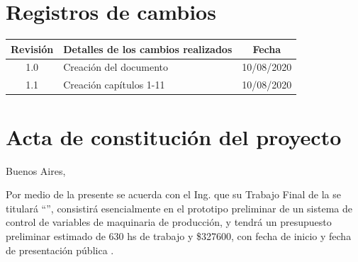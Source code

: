 \documentclass[11pt]{charter}
\begin{document}
\maketitle
\thispagestyle{empty}
\pagebreak


\thispagestyle{empty}
{\setlength{\parskip}{0pt}
\tableofcontents{}
}
\pagebreak


\section{Registros de cambios}
\label{sec:registro}


\begin{table}[ht]
\label{tab:registro}
\centering
\begin{tabularx}{\linewidth}{@{}|c|X|c|@{}}
\hline
\rowcolor[HTML]{C0C0C0} 
Revisión & \multicolumn{1}{c|}{\cellcolor[HTML]{C0C0C0}Detalles de los cambios realizados} & Fecha      \\ \hline
1.0      & Creación del documento                                          & 10/08/2020 \\ \hline
1.1 	 & Creación capítulos 1-11										   & 10/08/2020 \\ \hline
\end{tabularx}
\end{table}

\pagebreak



\section{Acta de constitución del proyecto}
\label{sec:acta}

\begin{flushright}
Buenos Aires, \fechaInicioName
\end{flushright}

\vspace{2cm}

Por medio de la presente se acuerda con el Ing. \authorname\hspace{1px} que su Trabajo Final de la \degreename\hspace{1px} se titulará ``\ttitle'', consistirá esencialmente en el prototipo preliminar de un sistema de control de variables de maquinaria de producción, y tendrá un presupuesto preliminar estimado de 630 hs de trabajo y \$327600, con fecha de inicio \fechaInicioName\hspace{1px} y fecha de presentación pública \fechaFinalName.
\end{document}
